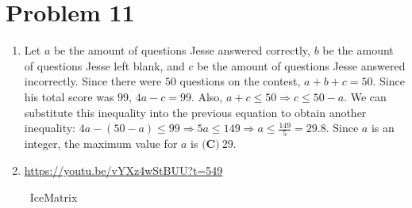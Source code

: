 \documentclass{article}%
\begin{document}
%
\section*{Problem 11}%
\label{sec:Problem11}%
\begin{enumerate}%
\item%
Let $a$ be the amount of questions Jesse answered correctly, $b$ be the amount of questions Jesse left blank, and $c$ be the amount of questions Jesse answered incorrectly. Since there were $50$ questions on the contest, $a+b+c=50$. Since his total score was $99$, $4a-c=99$. Also, $a+c\leq50 \Rightarrow c\leq50-a$. We can substitute this inequality into the previous equation to obtain another inequality: $4a-(50-a)\leq99 \Rightarrow 5a\leq149 \Rightarrow a\leq \frac{149}5=29.8$. Since $a$ is an integer, the maximum value for $a$ is $\boxed{\textbf{(C)}\ 29}$.

%
\item%
\href{https://youtu.be/vYXz4wStBUU?t=549}{https://youtu.be/vYXz4wStBUU?t=549}

~IceMatrix

%
\end{enumerate}

%
\end{document}
